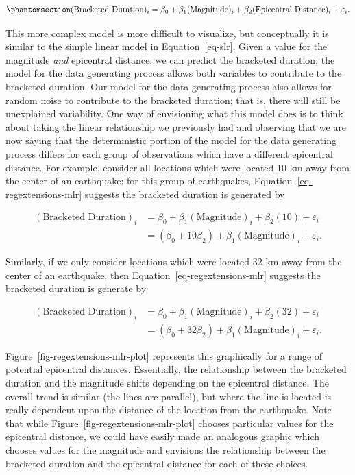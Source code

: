 \documentclass[
  letterpaper,
  DIV=11,
  numbers=noendperiod]{scrreprt}
\theoremstyle{definition}
\theoremstyle{definition}
\theoremstyle{plain}
\theoremstyle{remark}
\begin{document}
\begin{equation}\phantomsection\label{eq-regextensions-mlr}{(\text{Bracketed Duration})_i = \beta_0 + \beta_1(\text{Magnitude})_i + \beta_2(\text{Epicentral Distance})_i + \varepsilon_i.}\end{equation}

This more complex model is more difficult to visualize, but conceptually
it is similar to the simple linear model in Equation~\ref{eq-slr}. Given
a value for the magnitude \emph{and} epicentral distance, we can predict
the bracketed duration; the model for the data generating process allows
both variables to contribute to the bracketed duration. Our model for
the data generating process also allows for random noise to contribute
to the bracketed duration; that is, there will still be unexplained
variability. One way of envisioning what this model does is to think
about taking the linear relationship we previously had and observing
that we are now saying that the deterministic portion of the model for
the data generating process differs for each group of observations which
have a different epicentral distance. For example, consider all
locations which were located 10 km away from the center of an
earthquake; for this group of earthquakes,
Equation~\ref{eq-regextensions-mlr} suggests the bracketed duration is
generated by

\[
\begin{aligned}
(\text{Bracketed Duration})_i 
  &= \beta_0 + \beta_1(\text{Magnitude})_i + \beta_2(10) + \varepsilon_i \\
  &= \left(\beta_0 + 10\beta_2\right) + \beta_1(\text{Magnitude})_i + \varepsilon_i.
\end{aligned}
\]

Similarly, if we only consider locations which were located 32 km away
from the center of an earthquake, then
Equation~\ref{eq-regextensions-mlr} suggests the bracketed duration is
generate by

\[
\begin{aligned}
(\text{Bracketed Duration})_i 
  &= \beta_0 + \beta_1(\text{Magnitude})_i + \beta_2(32) + \varepsilon_i \\
  &= \left(\beta_0 + 32\beta_2\right) + \beta_1(\text{Magnitude})_i + \varepsilon_i.
\end{aligned}
\]

Figure~\ref{fig-regextensions-mlr-plot} represents this graphically for
a range of potential epicentral distances. Essentially, the relationship
between the bracketed duration and the magnitude shifts depending on the
epicentral distance. The overall trend is similar (the lines are
parallel), but where the line is located is really dependent upon the
distance of the location from the earthquake. Note that while
Figure~\ref{fig-regextensions-mlr-plot} chooses particular values for
the epicentral distance, we could have easily made an analogous graphic
which chooses values for the magnitude and envisions the relationship
between the bracketed duration and the epicentral distance for each of
these choices.
\end{document}
